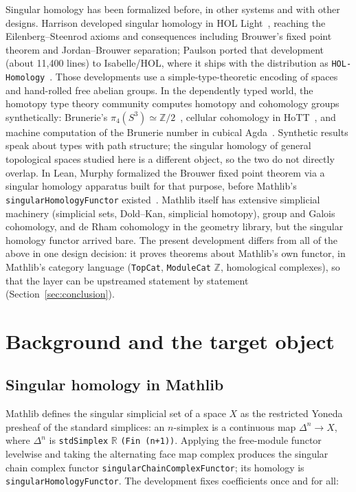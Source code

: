 \documentclass[11pt]{article}
\theoremstyle{remark}
\newcommand{\Z}{\mathbb{Z}}
\newcommand{\R}{\mathbb{R}}
\newcommand{\leanname}[1]{\texttt{#1}}
\begin{document}
Singular homology has been formalized before, in other systems and with
other designs. Harrison developed singular homology in HOL
Light~\cite{harrison-homology}, reaching the Eilenberg--Steenrod axioms and
consequences including Brouwer's fixed point theorem and Jordan--Brouwer
separation; Paulson ported that development (about 11{,}400 lines) to
Isabelle/HOL, where it ships with the distribution as
\texttt{HOL-Homology}~\cite{paulson-porting}. Those developments use a
simple-type-theoretic encoding of spaces and hand-rolled free abelian
groups. In the dependently typed world, the homotopy type theory community
computes homotopy and cohomology groups synthetically: Brunerie's
$\pi_4(S^3) \simeq \Z/2$~\cite{brunerie}, cellular cohomology in
HoTT~\cite{buchholtz-favonia}, and machine computation of the Brunerie
number in cubical Agda~\cite{ljungstrom-mortberg}. Synthetic results speak
about types with path structure; the singular homology of general topological
spaces studied here is a different object, so the two do not directly overlap. In
Lean, Murphy formalized the Brouwer fixed point theorem via a singular
homology apparatus built for that purpose, before Mathlib's
\leanname{singularHomologyFunctor} existed~\cite{birs-cohomology}. Mathlib
itself has extensive simplicial machinery (simplicial sets, Dold--Kan,
simplicial homotopy), group and Galois cohomology, and de Rham cohomology in
the geometry library, but the singular homology functor arrived bare. The
present development differs from all of the above in one design decision:
it proves theorems about Mathlib's own functor, in Mathlib's category
language (\leanname{TopCat}, \leanname{ModuleCat} $\Z$, homological complexes),
so that the layer can be upstreamed statement by statement
(Section~\ref{sec:conclusion}).

\section{Background and the target object}\label{sec:background}

\subsection{Singular homology in Mathlib}

Mathlib defines the singular simplicial set of a space $X$ as the restricted
Yoneda presheaf of the standard simplices: an $n$-simplex is a continuous map
$\Delta^n \to X$, where $\Delta^n$ is \leanname{stdSimplex} $\R$
\leanname{(Fin (n+1))}. Applying the free-module functor levelwise and taking
the alternating face map complex produces the singular chain complex functor
\leanname{singularChainComplexFunctor}; its homology is
\leanname{singularHomologyFunctor}. The development fixes coefficients once
and for all:
\end{document}
